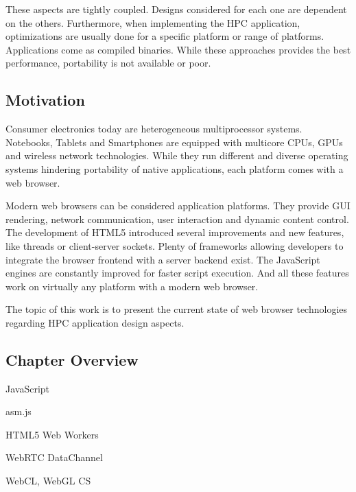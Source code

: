 These aspects are tightly coupled. Designs considered for each one are dependent on the others. Furthermore, when implementing the HPC application, optimizations are usually done for a specific platform or range of platforms. Applications come as compiled binaries. While these approaches provides the best performance, portability is not available or poor.


\subsection{Motivation}

Consumer electronics today are heterogeneous multiprocessor systems. Notebooks, Tablets and Smartphones are equipped with multicore CPUs, GPUs and wireless network technologies. While they run different and diverse operating systems hindering portability of native applications, each platform comes with a web browser.

Modern web browsers can be considered application platforms. They provide GUI rendering, network communication, user interaction and dynamic content control. The development of HTML5 introduced several improvements and new features, like threads or client-server sockets. Plenty of frameworks allowing developers to integrate the browser frontend with a server backend exist. The JavaScript engines are constantly improved for faster script execution. And all these features work on virtually any platform with a modern web browser.

The topic of this work is to present the current state of web browser technologies regarding HPC application design aspects.


\subsection{Chapter Overview}

JavaScript

asm.js

HTML5 Web Workers

WebRTC DataChannel

WebCL, WebGL CS
